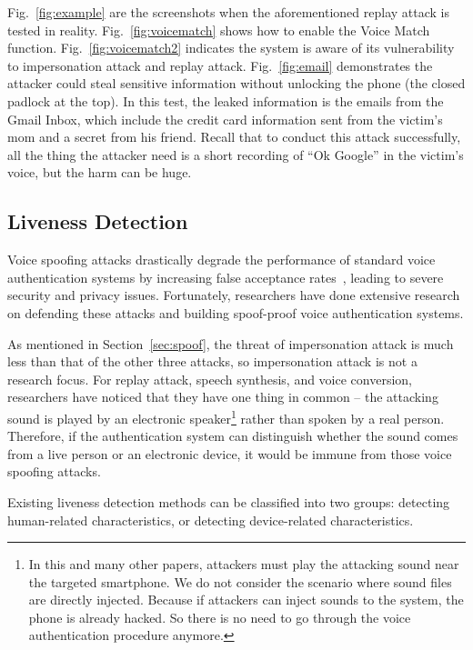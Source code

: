 Fig.~\ref{fig:example} are the screenshots when the aforementioned replay attack is tested in reality. Fig.~\ref{fig:voicematch} shows how to enable the Voice Match function. Fig.~\ref{fig:voicematch2} indicates the system is aware of its vulnerability to impersonation attack and replay attack. Fig.~\ref{fig:email} demonstrates the attacker could steal sensitive information without unlocking the phone (the closed padlock at the top). In this test, the leaked information is the emails from the Gmail Inbox, which include the credit card information sent from the victim's mom and a secret from his friend. Recall that to conduct this attack successfully, all the thing the attacker need is a short recording of ``Ok Google'' in the victim's voice, but the harm can be huge.


\subsection{Liveness Detection}
Voice spoofing attacks drastically degrade the performance of standard voice authentication systems by increasing false acceptance rates~\cite{wang2011channel, ergunay2015vulnerability}, leading to severe security and privacy issues. Fortunately, researchers have done extensive research on defending these attacks and building spoof-proof voice authentication systems.






As mentioned in Section~\ref{sec:spoof}, the threat of impersonation attack is much less than that of the other three attacks, so impersonation attack is not a research focus. For replay attack, speech synthesis, and voice conversion, researchers have noticed that they have one thing in common -- the attacking sound is played by an electronic speaker\footnote{In this and many other papers, attackers must play the attacking sound near the targeted smartphone. We do not consider the scenario where sound files are directly injected. Because if attackers can inject sounds to the system, the phone is already hacked. So there is no need to go through the voice authentication procedure anymore.} rather than spoken by a real person. Therefore, if the authentication system can distinguish whether the sound comes from a live person or an electronic device, it would be immune from those voice spoofing attacks.



Existing liveness detection methods can be classified into two groups: detecting human-related characteristics, or detecting device-related characteristics. 

